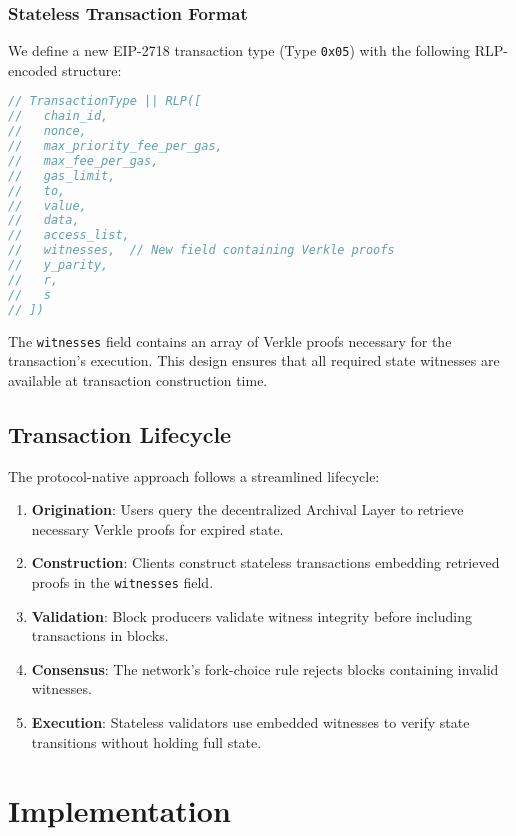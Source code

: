 \documentclass{article}
\begin{document}
\subsubsection{Stateless Transaction Format}

We define a new EIP-2718 transaction type (Type \texttt{0x05}) with the following RLP-encoded structure:

\begin{lstlisting}[language=C,caption={Stateless Transaction Structure},label={lst:tx-structure}]
// TransactionType || RLP([
//   chain_id, 
//   nonce, 
//   max_priority_fee_per_gas, 
//   max_fee_per_gas, 
//   gas_limit, 
//   to, 
//   value, 
//   data, 
//   access_list, 
//   witnesses,  // New field containing Verkle proofs
//   y_parity, 
//   r, 
//   s
// ])
\end{lstlisting}

The \texttt{witnesses} field contains an array of Verkle proofs necessary for the transaction's execution. This design ensures that all required state witnesses are available at transaction construction time.

\subsection{Transaction Lifecycle}

The protocol-native approach follows a streamlined lifecycle:

\begin{enumerate}
\item \textbf{Origination}: Users query the decentralized Archival Layer to retrieve necessary Verkle proofs for expired state.
\item \textbf{Construction}: Clients construct stateless transactions embedding retrieved proofs in the \texttt{witnesses} field.
\item \textbf{Validation}: Block producers validate witness integrity before including transactions in blocks.
\item \textbf{Consensus}: The network's fork-choice rule \cite{buterin2020gasper} rejects blocks containing invalid witnesses.
\item \textbf{Execution}: Stateless validators use embedded witnesses to verify state transitions without holding full state.
\end{enumerate}

\section{Implementation}
\end{document}
